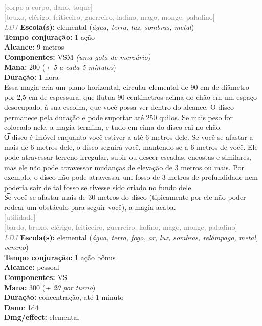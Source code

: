 \documentclass{RPG_Adventure}[2021/10/20]
\begin{document}
{\scriptsize \textcolor{gray}{[corpo-a-corpo, dano, toque]\\}}
{\scriptsize \textcolor{gray}{[bruxo, clérigo, feiticeiro, guerreiro, ladino, mago, monge, paladino]\\}}
{\tiny \textcolor{gray}{\textit{LDJ}}}\jump{}
{\small \t \textbf{Escola(s):} elemental (\textit{água, terra, luz, sombras, metal})\\\t \textbf{Tempo conjuração:} 1 ação\\\t \textbf{Alcance:} 9 metros\\\t \textbf{Componentes:} VSM \textit{(uma gota de mercúrio)}\\\t \textbf{Mana:} 200 (\textit{+ 5 a cada 5 minutos})\\\t \textbf{Duração:} 1 hora\\}
{\normalsize Essa magia cria um plano horizontal, circular elemental de 90 cm de diâmetro por 2,5 cm de espessura, que flutua 90 centímetros acima do chão em um espaço desocupado, à sua escolha, que você possa ver dentro do alcance. O disco permanece pela duração e pode suportar até 250 quilos. Se mais peso for colocado nele, a magia termina, e tudo em cima do disco cai no chão.\\\t O disco é imóvel enquanto você estiver a até 6 metros dele. Se você se afastar a mais de 6 metros dele, o disco seguirá você, mantendo-se a 6 metros de você. Ele pode atravessar terreno irregular, subir ou descer escadas, encostas e similares, mas ele não pode atravessar mudanças de elevação de 3 metros ou mais. Por exemplo, o disco não pode atravessar um fosso de 3 metros de profundidade nem poderia sair de tal fosso se tivesse sido criado no fundo dele.\\\t Se você se afastar mais de 30 metros do disco (tipicamente por ele não poder rodear um obstáculo para seguir você), a magia acaba.\\}
{\scriptsize \textcolor{gray}{[utilidade]\\}}
{\scriptsize \textcolor{gray}{[bardo, bruxo, clérigo, feiticeiro, guerreiro, ladino, mago, monge, paladino]\\}}
{\tiny \textcolor{gray}{\textit{LDJ}}}\jump{}
{\small \t \textbf{Escola(s):} elemental (\textit{água, terra, fogo, ar, luz, sombras, relâmpago, metal, veneno})\\\t \textbf{Tempo conjuração:} 1 ação bônus\\\t \textbf{Alcance:} pessoal\\\t \textbf{Componentes:} VS\\\t \textbf{Mana:} 300 (\textit{+ 20 por turno})\\\t \textbf{Duração:} concentração, até 1 minuto\\\t \textbf{Dano}: 1d4\\\t \textbf{Dmg/effect:} elemental\\}
\end{document}
